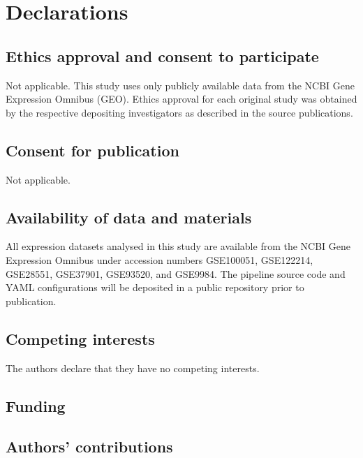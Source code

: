 \documentclass[11pt,a4paper]{article}
\begin{document}

\section*{Declarations}

\subsection*{Ethics approval and consent to participate}
Not applicable. This study uses only publicly available data
from the NCBI Gene Expression Omnibus (GEO). Ethics approval
for each original study was obtained by the respective
depositing investigators as described in the source publications.

\subsection*{Consent for publication}
Not applicable.

\subsection*{Availability of data and materials}
All expression datasets analysed in this study are available
from the NCBI Gene Expression Omnibus under accession numbers
GSE100051, GSE122214, GSE28551, GSE37901, GSE93520,
and GSE9984. The pipeline source code and YAML configurations
will be deposited in a public repository prior to publication.

\subsection*{Competing interests}
The authors declare that they have no competing interests.

\subsection*{Funding}

\subsection*{Authors' contributions}
\end{document}
